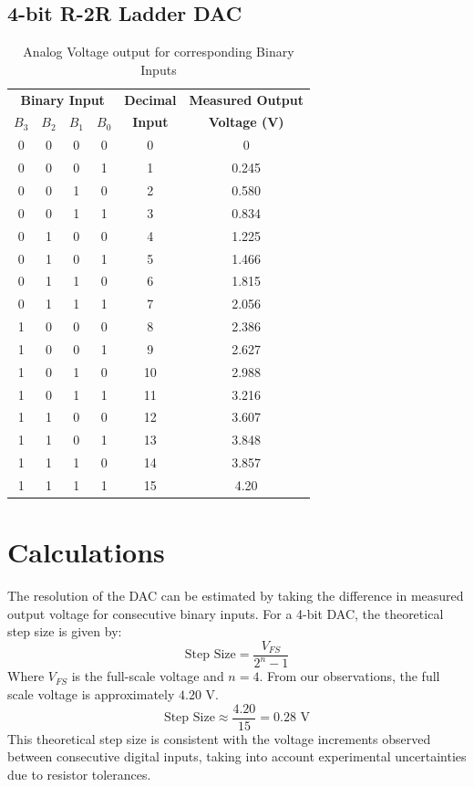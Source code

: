 \documentclass[12pt,a4paper]{article}
\begin{document}
\subsection{4-bit R-2R Ladder DAC}
\begin{table}[H]
\centering
\begin{tabular}{|c|c|c|c|c|c|}
\hline
\multicolumn{4}{|c|}{\textbf{Binary Input}} & \textbf{Decimal} & \textbf{Measured Output} \\
$B_3$ & $B_2$ & $B_1$ & $B_0$ & \textbf{Input} & \textbf{Voltage (V)} \\
\hline
0 & 0 & 0 & 0 & 0 & 0 \\
0 & 0 & 0 & 1 & 1 & 0.245 \\
0 & 0 & 1 & 0 & 2 & 0.580 \\
0 & 0 & 1 & 1 & 3 & 0.834 \\
0 & 1 & 0 & 0 & 4 & 1.225 \\
0 & 1 & 0 & 1 & 5 & 1.466 \\
0 & 1 & 1 & 0 & 6 & 1.815 \\
0 & 1 & 1 & 1 & 7 & 2.056 \\
1 & 0 & 0 & 0 & 8 & 2.386 \\
1 & 0 & 0 & 1 & 9 & 2.627 \\
1 & 0 & 1 & 0 & 10 & 2.988 \\
1 & 0 & 1 & 1 & 11 & 3.216 \\
1 & 1 & 0 & 0 & 12 & 3.607 \\
1 & 1 & 0 & 1 & 13 & 3.848 \\
1 & 1 & 1 & 0 & 14 & 3.857 \\
1 & 1 & 1 & 1 & 15 & 4.20 \\
\hline
\end{tabular}
\caption{Analog Voltage output for corresponding Binary Inputs}
\end{table}

\section{Calculations}
The resolution of the DAC can be estimated by taking the difference in measured output voltage for consecutive binary inputs. 
For a 4-bit DAC, the theoretical step size is given by:
$$ \text{Step Size} = \frac{V_{FS}}{2^n - 1} $$
Where $V_{FS}$ is the full-scale voltage and $n=4$.
From our observations, the full scale voltage is approximately $4.20\text{ V}$.
$$ \text{Step Size} \approx \frac{4.20}{15} = 0.28\text{ V} $$
This theoretical step size is consistent with the voltage increments observed between consecutive digital inputs, taking into account experimental uncertainties due to resistor tolerances.
\end{document}
